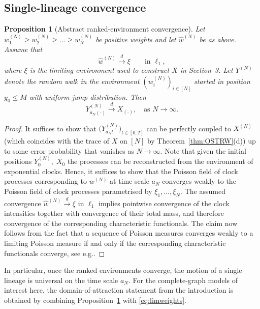 \documentclass[11pt,a4paper]{scrartcl}
\numberwithin{equation}{section}
\theoremstyle{plain}
\newtheorem{proposition}[theorem]{Proposition}
\theoremstyle{definition}
\theoremstyle{remark}
\begin{document}
\subsection*{Single-lineage convergence}
\begin{proposition}[Abstract ranked-environment convergence]\label{prop:convYtoX}
	Let $w^{(N)}_1\geq w^{(N)}_2\geq\dots\geq w^{(N)}_N$ be positive weights and let $\widehat{w}^{(N)}$ be as above. Assume that
	\[
	\widehat{w}^{(N)}\overset{d}{\longrightarrow}\xi \qquad \text{in }\ell_1,
	\]
	where $\xi$ is the limiting environment used to construct $X$ in Section~3. Let $Y^{(N)}$ denote the random walk in the environment $(w^{(N)}_i)_{i\in[N]}$ started in position $y_0\leq M$ with uniform jump distribution. Then
	\[
	Y^{(N)}_{a_N(\cdot)}\overset{d}{\longrightarrow} X_{(\cdot)},\quad\mbox{as }N\to\infty.
	\]
\end{proposition}
\begin{proof}
	It suffices to show that $\big(Y^{(N)}_{a_N t}\big)_{t\in[0,T]}$ can be perfectly coupled to $X^{(N)}$ (which coincides with the trace of $X$ on $[N]$ by Theorem~\ref{thm:OSTRW}(d)) up to some error probability that vanishes as $N\to\infty$. Note that given the initial positions $Y_0^{(N)},\;X_0$ the processes can be reconstructed from the environment of exponential clocks. Hence, it suffices to show that the Poisson field of clock processes corresponding to $w^{(N)}$ at time scale $a_N$ converges weakly to the Poisson field of clock processes parametrised by $\xi_1,\dots,\xi_N$. The assumed convergence $\widehat{w}^{(N)}\overset{d}{\to}\xi$ in $\ell_1$ implies pointwise convergence of the clock intensities together with convergence of their total mass, and therefore convergence of the corresponding characteristic functionals. The claim now follows from the fact that a sequence of Poisson measures converges weakly to a limiting Poisson measure if and only if the corresponding characteristic functionals converge, see e.g.\cite[Proposition 11.1.VIII]{DVJII}.
\end{proof}
In particular, once the ranked environments converge, the motion of a single lineage is universal on the time scale $a_N$. For the complete-graph models of interest here, the domain-of-attraction statement from the introduction is obtained by combining Proposition~\ref{prop:convYtoX} with \eqref{eq:limweights}.
\end{document}
